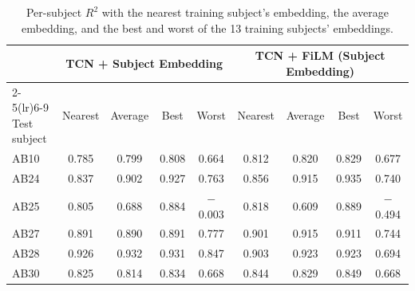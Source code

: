 \begin{table}[t]
\centering
\small
\setlength{\tabcolsep}{5pt}
\begin{tabular}{l cccc cccc}
\toprule
 & \multicolumn{4}{c}{TCN + Subject Embedding} & \multicolumn{4}{c}{TCN + FiLM (Subject Embedding)} \\
\cmidrule(lr){2-5}\cmidrule(lr){6-9}
Test subject & Nearest & Average & Best & Worst & Nearest & Average & Best & Worst \\
\midrule
AB10 & 0.785 & 0.799 & 0.808 & 0.664 & 0.812 & 0.820 & 0.829 & 0.677 \\
AB24 & 0.837 & 0.902 & 0.927 & 0.763 & 0.856 & 0.915 & 0.935 & 0.740 \\
AB25 & 0.805 & 0.688 & 0.884 & $-$0.003 & 0.818 & 0.609 & 0.889 & $-$0.494 \\
AB27 & 0.891 & 0.890 & 0.891 & 0.777 & 0.901 & 0.915 & 0.911 & 0.744 \\
AB28 & 0.926 & 0.932 & 0.931 & 0.847 & 0.903 & 0.923 & 0.923 & 0.694 \\
AB30 & 0.825 & 0.814 & 0.834 & 0.668 & 0.844 & 0.829 & 0.849 & 0.668 \\
\bottomrule
\end{tabular}
\caption{Per-subject $R^2$ with the nearest training subject's embedding, the average embedding, and the best and worst of the 13 training subjects' embeddings.}
\label{tab:embedding_ablation_subjects}
\end{table}
